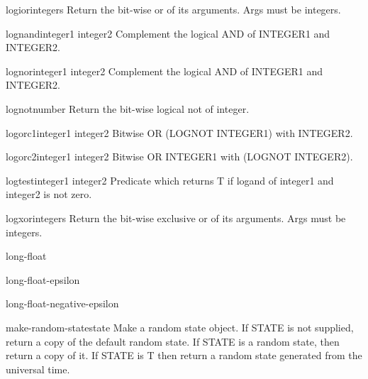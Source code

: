 \begin{function}{logior}{\rest integers}{}
  Return the bit-wise or of its arguments. Args must be integers.
\end{function}

\begin{function}{lognand}{integer1 integer2}{}
  Complement the logical AND of INTEGER1 and INTEGER2.
\end{function}

\begin{function}{lognor}{integer1 integer2}{}
  Complement the logical AND of INTEGER1 and INTEGER2.
\end{function}

\begin{function}{lognot}{number}{}
  Return the bit-wise logical not of integer.
\end{function}

\begin{function}{logorc1}{integer1 integer2}{}
  Bitwise OR (LOGNOT INTEGER1) with INTEGER2.
\end{function}

\begin{function}{logorc2}{integer1 integer2}{}
  Bitwise OR INTEGER1 with (LOGNOT INTEGER2).
\end{function}

\begin{function}{logtest}{integer1 integer2}{}
  Predicate which returns T if logand of integer1 and integer2 is not zero.
\end{function}

\begin{function}{logxor}{\rest integers}{}
  Return the bit-wise exclusive or of its arguments. Args must be integers.
\end{function}

\begin{type}{long-float}{}{}
  
\end{type}

\begin{constant}{long-float-epsilon}{}{}
  
\end{constant}

\begin{constant}{long-float-negative-epsilon}{}{}
  
\end{constant}

\begin{function}{make-random-state}{\op state}{}
  Make a random state object. If STATE is not supplied, return a copy
  of the default random state. If STATE is a random state, then return a
  copy of it. If STATE is T then return a random state generated from
  the universal time.
\end{function}

